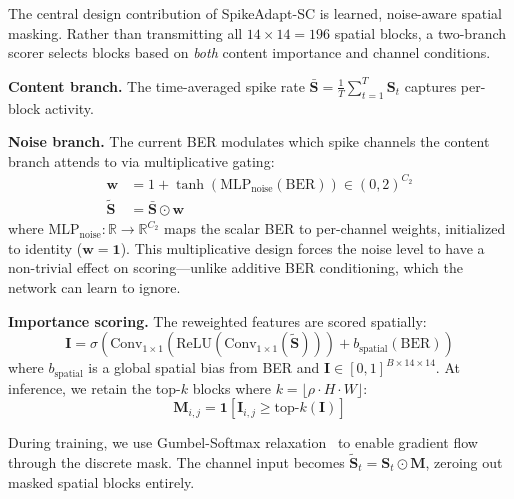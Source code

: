 \documentclass[conference]{IEEEtran}
\begin{document}
The central design contribution of SpikeAdapt-SC is learned, noise-aware spatial masking. Rather than transmitting all $14{\times}14 = 196$ spatial blocks, a two-branch scorer selects blocks based on \emph{both} content importance and channel conditions.

\textbf{Content branch.} The time-averaged spike rate $\bar{\mathbf{S}} = \frac{1}{T}\sum_{t=1}^{T} \mathbf{S}_t$ captures per-block activity.

\textbf{Noise branch.} The current BER modulates which spike channels the content branch attends to via multiplicative gating:
\begin{align}
    \mathbf{w} &= 1 + \tanh(\text{MLP}_{\text{noise}}(\text{BER})) \in (0,2)^{C_2} \label{eq:channel_gate}\\
    \tilde{\mathbf{S}} &= \bar{\mathbf{S}} \odot \mathbf{w} \label{eq:reweight}
\end{align}
where $\text{MLP}_{\text{noise}}: \mathbb{R} \to \mathbb{R}^{C_2}$ maps the scalar BER to per-channel weights, initialized to identity ($\mathbf{w}=\mathbf{1}$). This multiplicative design forces the noise level to have a non-trivial effect on scoring---unlike additive BER conditioning, which the network can learn to ignore.

\textbf{Importance scoring.} The reweighted features are scored spatially:
\begin{equation}
    \mathbf{I} = \sigma\!\left(\text{Conv}_{1{\times}1}\!\left(\text{ReLU}\!\left(\text{Conv}_{1{\times}1}(\tilde{\mathbf{S}})\right)\right) + b_{\text{spatial}}(\text{BER})\right)
    \label{eq:importance}
\end{equation}
where $b_{\text{spatial}}$ is a global spatial bias from BER and $\mathbf{I} \in [0,1]^{B \times 14 \times 14}$. At inference, we retain the top-$k$ blocks where $k = \lfloor \rho \cdot H \cdot W \rfloor$:
\begin{equation}
    \mathbf{M}_{i,j} = \mathbf{1}[\mathbf{I}_{i,j} \geq \text{top-}k(\mathbf{I})]
    \label{eq:mask}
\end{equation}

During training, we use Gumbel-Softmax relaxation~\cite{jang2017categorical} to enable gradient flow through the discrete mask. The channel input becomes $\tilde{\mathbf{S}}_t = \mathbf{S}_t \odot \mathbf{M}$, zeroing out masked spatial blocks entirely.
\end{document}
